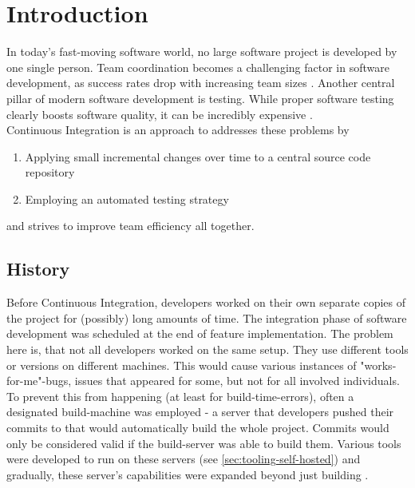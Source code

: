 \section{Introduction}\label{sec:introduction}

In today's fast-moving software world, no large software project is developed by
one single person. Team coordination becomes a challenging factor in software
development, as success rates drop with increasing team sizes
\cite{ambler:2010}. Another central pillar of modern software development is
testing. While proper software testing clearly boosts software quality, it can
be incredibly expensive \cite{dustin:1999}.\\

Continuous Integration is an approach to addresses these problems by
\begin{enumerate}[label=(\alph*)]
    \item Applying small incremental changes over time to a central source code
       repository
    \item Employing an automated testing strategy
\end{enumerate}

and strives to improve team efficiency all together.

\subsection{History}\label{sec:history}

Before Continuous Integration, developers worked on their own separate copies of
the project for (possibly) long amounts of time. The integration phase of
software development was scheduled at the end of feature implementation. The
problem here is, that not all developers worked on the same setup. They use
different tools or versions on different machines. This would cause various
instances of "works-for-me"-bugs, issues that appeared for some, but not for all
involved individuals.\\

To prevent this from happening (at least for build-time-errors), often a
designated build-machine was employed - a server that developers pushed their
commits to that would automatically build the whole project. Commits would only
be considered valid if the build-server was able to build them. Various tools
were developed to run on these servers (see \ref{sec:tooling-self-hosted}) and
gradually, these server's capabilities were expanded beyond just building
\cite{zilberfeld:2013}.\\

